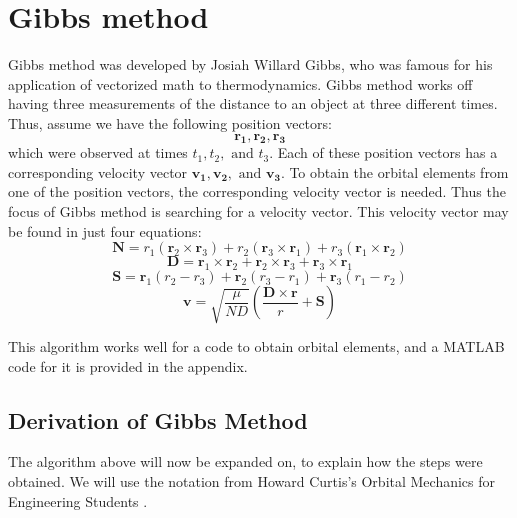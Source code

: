 \documentclass[12pt]{article}
\begin{document}
	\section{Gibbs method}
	Gibbs method was developed by Josiah Willard Gibbs\cite{gibbsBio}, who was famous for his application of vectorized math to thermodynamics. Gibbs method works off having three measurements of the distance to an object at three different times. Thus, assume we have the following position vectors:
	\begin{equation}
	\boldsymbol{r_1}, 	\boldsymbol{r_2},	\boldsymbol{r_3}
	\end{equation}
	which were observed at times $t_1, t_2, \text{ and  } t_3$. Each of these position vectors has a corresponding velocity vector $\boldsymbol{v_1}, 	\boldsymbol{v_2},	\text{ and  } \boldsymbol{v_3}$. To obtain the orbital elements from one of the position vectors, the corresponding velocity vector is needed. Thus the focus of Gibbs method is searching for a velocity vector. This velocity vector may be found in just four equations:
	\begin{equation}
	\mathbf { N } = r _ { 1 } \left( \mathbf { r } _ { 2 } \times \mathbf { r } _ { 3 } \right) + r _ { 2 } \left( \mathbf { r } _ { 3 } \times \mathbf { r } _ { 1 } \right) + r _ { 3 } \left( \mathbf { r } _ { 1 } \times \mathbf { r } _ { 2 } \right)
	\end{equation}
	\begin{equation}
	\mathbf { D } = \mathbf { r } _ { 1 } \times \mathbf { r } _ { 2 } + \mathbf { r } _ { 2 } \times \mathbf { r } _ { 3 } + \mathbf { r } _ { 3 } \times \mathbf { r } _ { 1 }
	\end{equation}
	\begin{equation}
	\mathbf { S } = \mathbf { r } _ { 1 } \left( r _ { 2 } - r _ { 3 } \right) + \mathbf { r } _ { 2 } \left( r _ { 3 } - r _ { 1 } \right) + \mathbf { r } _ { 3 } \left( r _ { 1 } - r _ { 2 } \right)
	\end{equation}
	\begin{equation}
	\mathbf { v } = \sqrt { \frac { \mu } { N D } } \left( \frac { \mathbf { D } \times \mathbf { r } } { r } + \mathbf { S } \right)
	\end{equation}
	
	This algorithm works well for a code to obtain orbital elements, and a MATLAB code for it is provided in the appendix.
		
	\subsection{Derivation of Gibbs Method}
	The algorithm above will now be expanded on, to explain how the steps were obtained. We will use the notation from Howard Curtis's Orbital Mechanics for Engineering Students \cite{curtis2013_gibbs}. 
	
\end{document}
